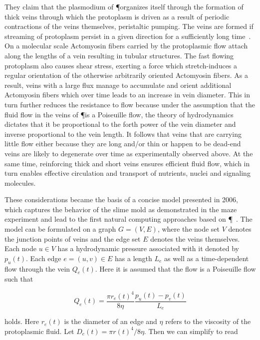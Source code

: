 			They claim that the plasmodium of \P organizes itself through the formation of thick veins through which the protoplasm is driven as a result of periodic contractions of the veins themselves, \ie peristaltic pumping. The veins are formed if streaming of protoplasm persist in a given direction for a sufficiently long time~\cite{nakagaki2000interaction}. On a molecular scale Actomyosin fibers carried by the protoplasmic flow attach along the lengths of a vein resulting in tubular structures. The fast flowing protoplasm also causes shear stress, exerting a force which stretch-induces a regular orientation of the otherwise arbitrarily oriented Actomyosin fibers. As a result, veins with a large flux manage to accumulate and orient additional Actomyosin fibers which over time leads to an increase in vein diameter. This in turn further reduces the resistance to flow because under the assumption that the fluid flow in the veins of \P is a Poiseuille flow, the theory of hydrodynamics dictates that it be proportional to the forth power of the vein diameter and inverse proportional to the vein length. It follows that veins that are carrying little flow either because they are long and/or thin or happen to be dead-end veins are likely to degenerate over time as experimentally observed above. At the same time, reinforcing thick and short veins ensures efficient fluid flow, which in turn enables effective circulation and transport of nutrients, nuclei and signaling molecules.

			These considerations became the basis of a concise model presented in 2006, which captures the behavior of the slime mold as demonstrated in the maze experiment and lead to the first natural computing approaches based on \P~\cite{Tero2006115}. The model can be formulated on a graph $G = (V,E)$, where the node set $V$ denotes the junction points of veins and the edge set $E$ denotes the veins themselves. Each node $u \in V$ has a hydrodynamic pressure associated with it denoted by $p_u(t)$. Each edge $e = (u,v) \in E$ has a length $L_e$ as well as a time-dependent flow through the vein $Q_e(t)$. Here it is assumed that the flow is a Poiseuille flow such that

			\begin{equation}
				Q_e(t) = \frac{\pi r_e(t)^4}{ 8 \eta} \frac{p_u(t)-p_v(t)}{L_e}
				\label{eq:flow_initial}
			\end{equation}
			
			holds. Here $r_e(t)$ is the diameter of an edge and $\eta$ refers to the viscosity of the protoplasmic fluid. Let $D_e(t) = \pi r(t)^4/ 8 \eta$. Then we can simplify  to read

